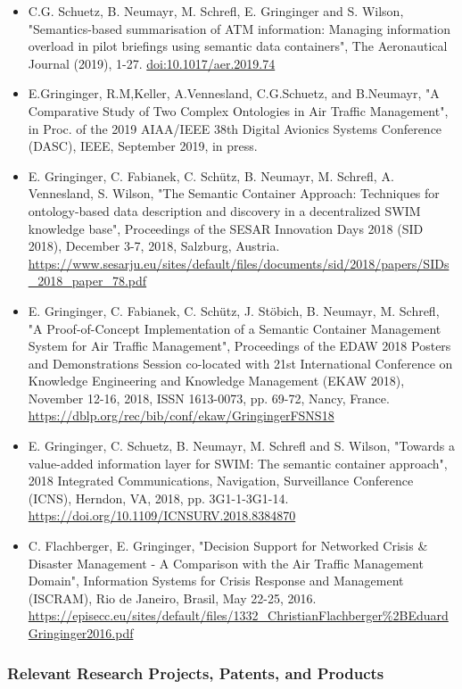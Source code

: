 \documentclass[a4paper,11pt]{article}
\begin{document}
\begin{itemize}
\item C.G. Schuetz, B. Neumayr, M. Schrefl, E. Gringinger and S. Wilson, "Semantics-based summarisation of ATM information: Managing information overload in pilot briefings using semantic data containers", The Aeronautical Journal (2019), 1-27. \url{doi:10.1017/aer.2019.74}
\item E.Gringinger, R.M,Keller, A.Vennesland, C.G.Schuetz, and B.Neumayr, "A Comparative Study of Two Complex Ontologies in Air Traffic Management", in Proc. of the 2019 AIAA/IEEE 38th Digital Avionics Systems Conference (DASC), IEEE, September 2019, in press.
\item E. Gringinger, C. Fabianek, C. Schütz, B. Neumayr, M. Schrefl, A. Vennesland, S. Wilson, "The Semantic Container Approach: Techniques for ontology-based data description and discovery in a decentralized SWIM knowledge base", Proceedings of the SESAR Innovation Days 2018 (SID 2018), December 3-7, 2018, Salzburg, Austria. \url{https://www.sesarju.eu/sites/default/files/documents/sid/2018/papers/SIDs\_2018\_paper\_78.pdf}
\item E. Gringinger, C. Fabianek, C. Schütz, J. Stöbich, B. Neumayr, M. Schrefl, "A Proof-of-Concept Implementation of a Semantic Container Management System for Air Traffic Management", Proceedings of the EDAW 2018 Posters and Demonstrations Session co-located with 21st International Conference on Knowledge Engineering and Knowledge Management (EKAW 2018), November 12-16, 2018, ISSN 1613-0073, pp. 69-72, Nancy, France. \url{https://dblp.org/rec/bib/conf/ekaw/GringingerFSNS18}
\item E. Gringinger, C. Schuetz, B. Neumayr, M. Schrefl and S. Wilson, "Towards a value-added information layer for SWIM: The semantic container approach", 2018 Integrated Communications, Navigation, Surveillance Conference (ICNS), Herndon, VA, 2018, pp. 3G1-1-3G1-14. \url{https://doi.org/10.1109/ICNSURV.2018.8384870}
\item C. Flachberger, E. Gringinger, "Decision Support for Networked Crisis \& Disaster Management - A Comparison with the Air Traffic Management Domain", Information Systems for Crisis Response and Management (ISCRAM), Rio de Janeiro, Brasil, May 22-25, 2016. \url{https://episecc.eu/sites/default/files/1332\_ChristianFlachberger\%2BEduardGringinger2016.pdf}
\end{itemize}


\subsubsection*{Relevant Research Projects, Patents, and Products}
\end{document}
